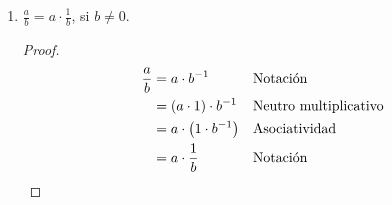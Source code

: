 \documentclass[11pt]{article}
\begin{document}
\begin{enumerate}[label=\alph*)]
 \item $\frac{a}{b}=a\cdot \frac{1}{b}$, si $b\neq 0$.%
 \begin{proof} 
 \begin{align*}
  \frac{a}{b} &= a\cdot b^{-1} && \text{Notación}\\
  &= (a\cdot 1) \cdot b^{-1} && \text{Neutro multiplicativo}\\
  &= a\cdot \bigl(1\cdot b^{-1}\bigr) && \text{Asociatividad}\\
  &= a\cdot \frac{1}{b} && \text{Notación} \qedhere
 \end{align*}
 \end{proof}


\end{enumerate}
\end{document}

